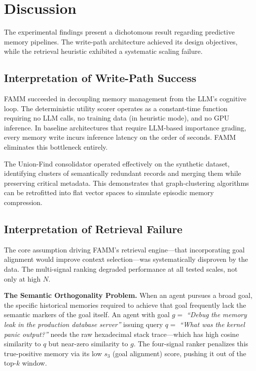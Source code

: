 \documentclass[conference]{IEEEtran}
\begin{document}
\section{Discussion}
\label{sec:discussion}

The experimental findings present a dichotomous result regarding predictive memory pipelines. The write-path architecture achieved its design objectives, while the retrieval heuristic exhibited a systematic scaling failure.

\subsection{Interpretation of Write-Path Success}
FAMM succeeded in decoupling memory management from the LLM's cognitive loop. The deterministic utility scorer operates as a constant-time function requiring no LLM calls, no training data (in heuristic mode), and no GPU inference. In baseline architectures that require LLM-based importance grading, every memory write incurs inference latency on the order of seconds. FAMM eliminates this bottleneck entirely.

The Union-Find consolidator operated effectively on the synthetic dataset, identifying clusters of semantically redundant records and merging them while preserving critical metadata. This demonstrates that graph-clustering algorithms can be retrofitted into flat vector spaces to simulate episodic memory compression.

\subsection{Interpretation of Retrieval Failure}
The core assumption driving FAMM's retrieval engine---that incorporating goal alignment would improve context selection---was systematically disproven by the data. The multi-signal ranking degraded performance at all tested scales, not only at high $N$.

\textbf{The Semantic Orthogonality Problem.} When an agent pursues a broad goal, the specific historical memories required to achieve that goal frequently lack the semantic markers of the goal itself. An agent with goal $g =$ \textit{``Debug the memory leak in the production database server''} issuing query $q =$ \textit{``What was the kernel panic output?''} needs the raw hexadecimal stack trace---which has high cosine similarity to $q$ but near-zero similarity to $g$. The four-signal ranker penalizes this true-positive memory via its low $s_3$ (goal alignment) score, pushing it out of the top-$k$ window.
\end{document}
